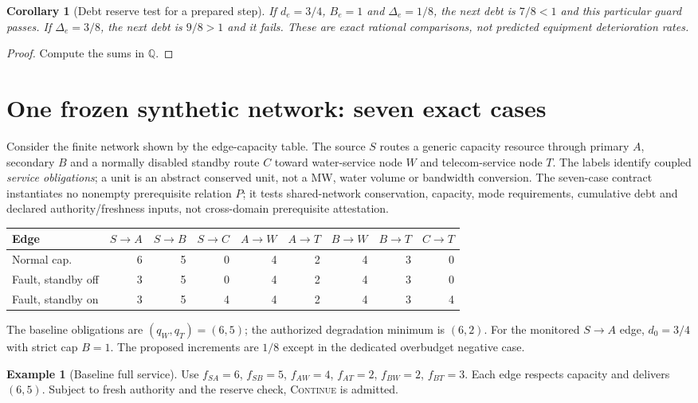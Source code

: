 \documentclass[11pt,letterpaper]{article}
\newtheorem{corollary}[theorem]{Corollary}
\theoremstyle{definition}\newtheorem{definition}[theorem]{Definition}\newtheorem{example}[theorem]{Example}
\theoremstyle{remark}\newtheorem{remark}[theorem]{Remark}
\begin{document}
\begin{corollary}[Debt reserve test for a prepared step]\label{cor:reserve}
If $d_e=3/4$, $B_e=1$ and $\Delta_e=1/8$, the next debt is $7/8<1$ and this particular guard passes. If $\Delta_e=3/8$, the next debt is $9/8>1$ and it fails. These are exact rational comparisons, not predicted equipment deterioration rates.
\end{corollary}
\begin{proof}Compute the sums in $\mathbb Q$.\end{proof}

\section{One frozen synthetic network: seven exact cases}
Consider the finite network shown by the edge-capacity table. The source $S$ routes a generic capacity resource through primary $A$, secondary $B$ and a normally disabled standby route $C$ toward water-service node $W$ and telecom-service node $T$. The labels identify coupled \emph{service obligations}; a unit is an abstract conserved unit, not a MW, water volume or bandwidth conversion. The seven-case contract instantiates no nonempty prerequisite relation $P$; it tests shared-network conservation, capacity, mode requirements, cumulative debt and declared authority/freshness inputs, not cross-domain prerequisite attestation.
\begin{center}\small
\begin{tabular}{@{}lrrrrrrrr@{}}\toprule
Edge & $S\!\to\!A$&$S\!\to\!B$&$S\!\to\!C$&$A\!\to\!W$&$A\!\to\!T$&$B\!\to\!W$&$B\!\to\!T$&$C\!\to\!T$\\\midrule
Normal cap.&6&5&0&4&2&4&3&0\\
Fault, standby off&3&5&0&4&2&4&3&0\\
Fault, standby on&3&5&4&4&2&4&3&4\\\bottomrule
\end{tabular}
\end{center}
The baseline obligations are $(q_W,q_T)=(6,5)$; the authorized degradation minimum is $(6,2)$. For the monitored $S\to A$ edge, $d_0=3/4$ with strict cap $B=1$. The proposed increments are $1/8$ except in the dedicated overbudget negative case.
\begin{example}[Baseline full service]
Use $f_{SA}=6$, $f_{SB}=5$, $f_{AW}=4$, $f_{AT}=2$, $f_{BW}=2$, $f_{BT}=3$. Each edge respects capacity and delivers $(6,5)$. Subject to fresh authority and the reserve check, \textsc{Continue} is admitted.
\end{example}
\end{document}
